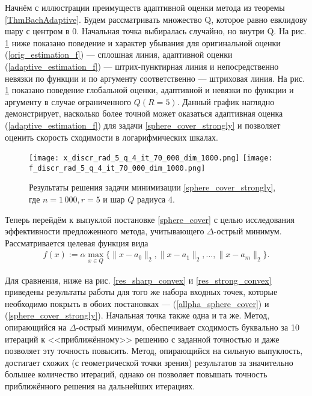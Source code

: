Начнём с иллюстрации преимуществ адаптивной оценки метода \cite{Bach_2012} из теоремы \ref{ThmBachAdaptive}. Будем рассматривать множество Q, которое равно евклидову шару с центром в 0. Начальная точка выбиралась случайно, но внутри Q. На рис. \ref{res_ex_strong_r5} ниже показано поведение и характер убывания для оригинальной оценки (\ref{orig_estimation_f}) --- сплошная линия, адаптивной оценки (\ref{adaptive_estimation_f}) --- штрих-пунктирная линия и непосредственно невязки по функции и по аргументу соответственно --- штриховая линия. На рис. \ref{res_ex_strong_r5} показано поведение глобальной оценки, адаптивной и невязки по функции и аргументу в случае ограниченного $Q (R = 5)$. Данный график наглядно демонстрирует, насколько более точной может оказаться адаптивная оценка (\ref{adaptive_estimation_f}) для задачи \eqref{sphere_cover_strongly} и позволяет оценить скорость сходимости в логарифмических шкалах.

\begin{figure}[h]
    \texttt{[image: x\_discr\_rad\_5\_q\_4\_it\_70\_000\_dim\_1000.png]}
    \endminipage\hfill
    \texttt{[image: f\_discr\_rad\_5\_q\_4\_it\_70\_000\_dim\_1000.png]}
    \endminipage\hfill
    \caption{Результаты решения задачи минимизации \eqref{sphere_cover_strongly}, где  $n= 1\,000, r = 5$ и  шар $Q$ радиуса 4.}
    \label{res_ex_strong_r5}
\end{figure}

Теперь перейдём к выпуклой постановке \eqref{sphere_cover} с целью исследования эффективности предложенного метода, учитывающего $\Delta$-острый минимум. Рассматривается целевая функция вида
\begin{gather}\label{allpha_sphere_cover}
    f(x) := \alpha \max_{x\in Q}\{\|x - a_0\|_2, \|x - a_1\|_2, ..., \|x - a_m\|_2\}.
\end{gather}

Для сравнения, ниже на рис. \ref{res_sharp_convex} и \ref{res_strong_convex} приведены результаты работы для того же набора входных точек, которые необходимо покрыть в обоих постановках --- (\ref{allpha_sphere_cover}) и (\ref{sphere_cover_strongly}). Начальная точка также одна и та же. Метод, опирающийся на $\Delta$-острый минимум, обеспечивает сходимость буквально за 10 итераций к <<приближённому>> решению с заданной точностью и даже позволяет эту точность повысить. Метод, опирающийся на сильную выпуклость, достигает схожих (с геометрической точки зрения) результатов за значительно большее количество итераций, однако он позволяет повышать точность приближённого решения на дальнейших итерациях.

